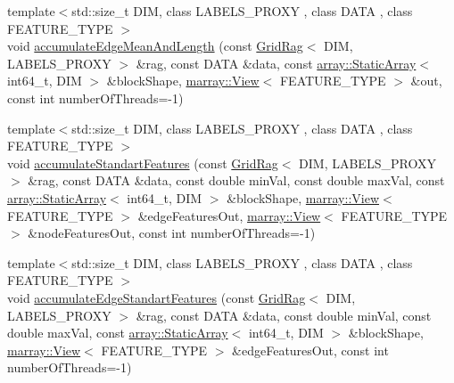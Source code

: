 \begin{DoxyCompactItemize}
\item 
{\footnotesize template$<$std\+::size\+\_\+t D\+I\+M, class L\+A\+B\+E\+L\+S\+\_\+\+P\+R\+O\+X\+Y , class D\+A\+T\+A , class F\+E\+A\+T\+U\+R\+E\+\_\+\+T\+Y\+P\+E $>$ }\\void \hyperlink{namespacenifty_1_1graph_a44f9d32c6516b8a8fad328a7bffff8fe}{accumulate\+Edge\+Mean\+And\+Length} (const \hyperlink{classnifty_1_1graph_1_1GridRag}{Grid\+Rag}$<$ D\+I\+M, L\+A\+B\+E\+L\+S\+\_\+\+P\+R\+O\+X\+Y $>$ \&rag, const D\+A\+T\+A \&data, const \hyperlink{namespacenifty_1_1array_a683f151f19c851754e0c6d55ed16a0c2}{array\+::\+Static\+Array}$<$ int64\+\_\+t, D\+I\+M $>$ \&block\+Shape, \hyperlink{classandres_1_1View}{marray\+::\+View}$<$ F\+E\+A\+T\+U\+R\+E\+\_\+\+T\+Y\+P\+E $>$ \&out, const int number\+Of\+Threads=-\/1)
\item 
{\footnotesize template$<$std\+::size\+\_\+t D\+I\+M, class L\+A\+B\+E\+L\+S\+\_\+\+P\+R\+O\+X\+Y , class D\+A\+T\+A , class F\+E\+A\+T\+U\+R\+E\+\_\+\+T\+Y\+P\+E $>$ }\\void \hyperlink{namespacenifty_1_1graph_a42c0895aee417f8a18d643aad2591c8b}{accumulate\+Standart\+Features} (const \hyperlink{classnifty_1_1graph_1_1GridRag}{Grid\+Rag}$<$ D\+I\+M, L\+A\+B\+E\+L\+S\+\_\+\+P\+R\+O\+X\+Y $>$ \&rag, const D\+A\+T\+A \&data, const double min\+Val, const double max\+Val, const \hyperlink{namespacenifty_1_1array_a683f151f19c851754e0c6d55ed16a0c2}{array\+::\+Static\+Array}$<$ int64\+\_\+t, D\+I\+M $>$ \&block\+Shape, \hyperlink{classandres_1_1View}{marray\+::\+View}$<$ F\+E\+A\+T\+U\+R\+E\+\_\+\+T\+Y\+P\+E $>$ \&edge\+Features\+Out, \hyperlink{classandres_1_1View}{marray\+::\+View}$<$ F\+E\+A\+T\+U\+R\+E\+\_\+\+T\+Y\+P\+E $>$ \&node\+Features\+Out, const int number\+Of\+Threads=-\/1)
\item 
{\footnotesize template$<$std\+::size\+\_\+t D\+I\+M, class L\+A\+B\+E\+L\+S\+\_\+\+P\+R\+O\+X\+Y , class D\+A\+T\+A , class F\+E\+A\+T\+U\+R\+E\+\_\+\+T\+Y\+P\+E $>$ }\\void \hyperlink{namespacenifty_1_1graph_a418009772088e19eb7c14b46e6a01eb5}{accumulate\+Edge\+Standart\+Features} (const \hyperlink{classnifty_1_1graph_1_1GridRag}{Grid\+Rag}$<$ D\+I\+M, L\+A\+B\+E\+L\+S\+\_\+\+P\+R\+O\+X\+Y $>$ \&rag, const D\+A\+T\+A \&data, const double min\+Val, const double max\+Val, const \hyperlink{namespacenifty_1_1array_a683f151f19c851754e0c6d55ed16a0c2}{array\+::\+Static\+Array}$<$ int64\+\_\+t, D\+I\+M $>$ \&block\+Shape, \hyperlink{classandres_1_1View}{marray\+::\+View}$<$ F\+E\+A\+T\+U\+R\+E\+\_\+\+T\+Y\+P\+E $>$ \&edge\+Features\+Out, const int number\+Of\+Threads=-\/1)

\end{DoxyCompactItemize}
